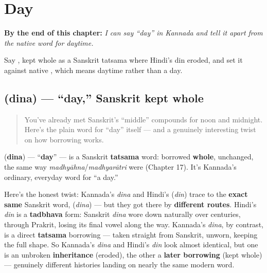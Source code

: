 
\chapter{Day}
\label{ch:ka-day}

\begin{chapteropening}
\textbf{By the end of this chapter:} \emph{I can say \textquotedblleft{}day\textquotedblright{} in Kannada and tell it apart from the native word for daytime.}

Say , kept whole as a Sanskrit tatsama where Hindi's din eroded, and set it against native , which means daytime rather than a day.
\end{chapteropening}

\section[\texorpdfstring{\kn{ದಿನ} (dina)}{ದಿನ (dina)}]{ (dina) — \textquotedblleft{}day,\textquotedblright{} Sanskrit kept whole}

\label{lesson:KA-C23-dina}



\begin{quote}
You've already met Sanskrit's \textquotedblleft{}middle\textquotedblright{} compounds for noon and midnight. Here's the plain word for \textquotedblleft{}day\textquotedblright{} itself — and a genuinely interesting twist on how borrowing works.
\end{quote}

\begin{cousinweb}
\textbf{} (\textbf{dina}) — \textquotedblleft{}\textbf{day}\textquotedblright{} — is a Sanskrit \textbf{tatsama} word: borrowed \textbf{whole}, unchanged, the same way \emph{madhyāhna}/\emph{madhyarātri} were (Chapter 17). It's Kannada's ordinary, everyday word for \textquotedblleft{}a day.\textquotedblright{}
\end{cousinweb}

\begin{cousinweb}
Here's the honest twist: Kannada's \emph{dina} and Hindi's \textbf{} (\emph{din}) trace to the \textbf{exact same} Sanskrit word, \textbf{} (\emph{dina}) — but they got there by \textbf{different routes}. Hindi's \emph{din} is a \textbf{tadbhava} form: Sanskrit \emph{dina} wore down naturally over centuries, through Prakrit, losing its final vowel along the way. Kannada's \emph{dina}, by contrast, is a direct \textbf{tatsama} borrowing — taken straight from Sanskrit, unworn, keeping the full shape. So Kannada's \emph{dina} and Hindi's \emph{din} look almost identical, but one is an unbroken \textbf{inheritance} (eroded), the other a \textbf{later borrowing} (kept whole) — genuinely different histories landing on nearly the same modern word.
\end{cousinweb}

